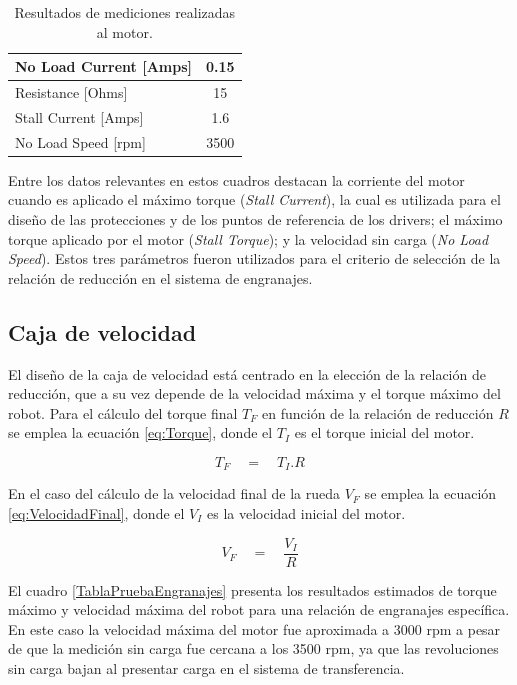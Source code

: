 \begin{table}[htbp]
	\caption[Caracterización de motores]{Resultados de mediciones realizadas al motor.}
	\centering
	\begin{tabular}{|l|c|}
		\hline
		No Load Current [Amps] & 0.15 \\ \hline
		Resistance [Ohms] & 15 \\ \hline
		Stall Current [Amps] & 1.6 \\ \hline
		No Load Speed [rpm] & 3500 \\ \hline
	\end{tabular}
	\label{MabuchiResultados}
\end{table}


Entre los datos relevantes en estos cuadros destacan la corriente del motor cuando es aplicado el máximo torque (\textit{Stall Current}), la cual es utilizada para el diseño de las protecciones y de los puntos de referencia de los drivers; el máximo torque aplicado por el motor (\textit{Stall Torque});  y  la velocidad sin carga (\textit{No Load Speed}). Estos tres parámetros fueron  utilizados para el criterio de selección de la relación de reducción en el sistema de engranajes.

\subsection{Caja de velocidad}


El diseño de la caja de velocidad está centrado en la elección de la relación de reducción, que a su vez depende de la velocidad máxima y el torque máximo del robot. Para el cálculo del torque final ${ T }_{ F }$ en función de la relación de reducción $R$ se emplea la ecuación \ref{eq:Torque}, donde el ${ T }_{ I }$ es el torque inicial del motor.


\begin{equation}
\label{eq:Torque}
{ T }_{ F }\quad =\quad { T }_{ I }.R
\end{equation}


En el caso del cálculo de la velocidad final de la rueda ${ V }_{ F }$ se emplea la ecuación \ref{eq:VelocidadFinal}, donde el ${ V }_{ I }$ es la velocidad inicial del motor.

\begin{equation}
\label{eq:VelocidadFinal}
{ V }_{ F }\quad =\quad \frac { { V }_{ I } }{ R } 
\end{equation}


El cuadro \ref{TablaPruebaEngranajes} presenta los resultados estimados  de torque máximo y velocidad máxima del robot para una relación de engranajes específica. En este caso la velocidad máxima del motor fue aproximada a 3000 rpm a pesar de que la medición sin carga fue cercana a los 3500 rpm, ya que las revoluciones sin carga bajan al presentar carga en el sistema de transferencia.

